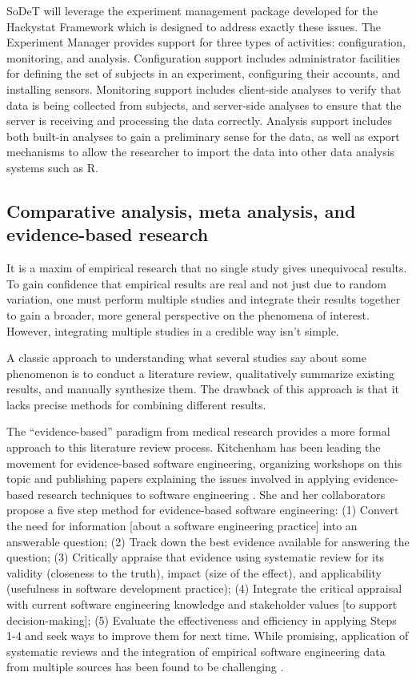 SoDeT will leverage the experiment management package developed for the Hackystat
Framework which is designed to address exactly these issues.  The Experiment 
Manager provides support for three types of activities: configuration, monitoring,
and analysis.  Configuration support includes administrator facilities for defining
the set of subjects in an experiment, configuring their accounts, and installing
sensors.  Monitoring support includes client-side analyses to verify that data
is being collected from subjects, and server-side analyses to ensure that the server
is receiving and processing the data correctly.  Analysis support includes both 
built-in analyses to gain a preliminary sense for the data, as well as export
mechanisms to allow the researcher to import the data into other data analysis systems
such as R. 

\subsection{Comparative analysis, meta analysis, and evidence-based research}
\label{sec:metaanalysis}

It is a maxim of empirical research that no single study gives unequivocal
results.  To gain confidence that empirical results are real and not just
due to random variation, one must perform multiple studies and integrate
their results together to gain a broader, more general perspective on the
phenomena of interest. However, integrating multiple studies in a credible
way isn't simple.
 
A classic approach to understanding what several studies say about some
phenomenon is to conduct a literature review, qualitatively summarize
existing results, and manually synthesize them. The drawback of this
approach is that it lacks precise methods for combining different results.

The ``evidence-based'' paradigm from medical research provides a more
formal approach to this literature review process.  Kitchenham has been
leading the movement for evidence-based software engineering, organizing
workshops on this topic and publishing papers explaining the issues
involved in applying evidence-based research techniques to software
engineering \cite{Kitchenham04,Kitchenham04a}.  She and her collaborators
propose a five step method for evidence-based software engineering: (1)
Convert the need for information [about a software engineering practice]
into an answerable question; (2) Track down the best evidence available for
answering the question; (3) Critically appraise that evidence using
systematic review for its validity (closeness to the truth), impact (size
of the effect), and applicability (usefulness in software development
practice); (4) Integrate the critical appraisal with current software
engineering knowledge and stakeholder values [to support decision-making];
(5) Evaluate the effectiveness and efficiency in applying Steps 1-4 and
seek ways to improve them for next time.  While promising, application of
systematic reviews and the integration of empirical software engineering
data from multiple sources has been found to be challenging
\cite{Jedlitschka04}.

